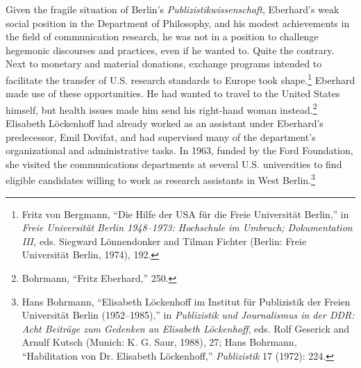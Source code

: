 \documentclass{tufte-handout}
\begin{document}
Given the fragile situation of Berlin's \emph{Publizistikwissenschaft},
Eberhard's weak social position in the Department of Philosophy, and his
modest achievements in the field of communication research, he was not
in a position to challenge hegemonic discourses and practices, even if
he wanted to. Quite the contrary. Next to monetary and material
donations, exchange programs intended to facilitate the transfer of U.S.
research standards to Europe took shape.\footnote{Fritz von Bergmann,
  ``Die Hilfe der USA für die Freie Universität Berlin,'' in \emph{Freie
  Universität Berlin 1948--1973: Hochschule im Umbruch; Dokumentation
  III,} eds. Siegward Lönnendonker and Tilman Fichter (Berlin: Freie
  Universität Berlin, 1974), 192.} Eberhard made use of these
opportunities. He had wanted to travel to the United States himself, but
health issues made him send his right-hand woman instead.\footnote{Bohrmann,
  ``Fritz Eberhard,'' 250.} Elisabeth Löckenhoff had already worked as
an assistant under Eberhard's predecessor, Emil Dovifat, and had
supervised many of the department's organizational and administrative
tasks. In 1963, funded by the Ford Foundation, she visited the
communications departments at several U.S. universities to find eligible
candidates willing to work as research assistants in West
Berlin.\footnote{Hans Bohrmann, ``Elisabeth Löckenhoff im Institut für
  Publizistik der Freien Universität Berlin (1952--1985),'' in
  \emph{Publizistik und Journalismus in der DDR: Acht Beiträge zum
  Gedenken an Elisabeth Löckenhoff}, eds. Rolf Geserick and Arnulf
  Kutsch (Munich: K. G. Saur, 1988), 27; Hans Bohrmann, ``Habilitation
  von Dr. Elisabeth Löckenhoff,'' \emph{Publizistik} 17 (1972): 224.}
\end{document}
